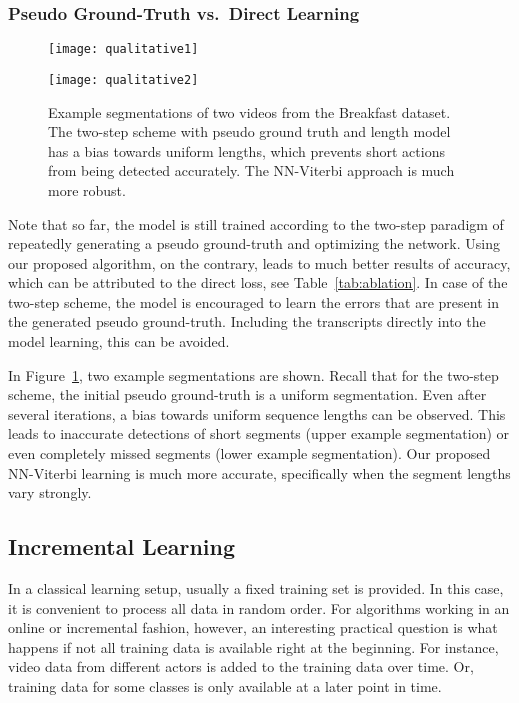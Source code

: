 \documentclass[10pt,twocolumn,letterpaper]{article}
\begin{document}
\subsubsection{Pseudo Ground-Truth vs.\ Direct Learning}
\begin{figure}[tb]
    \centering
    \texttt{[image: qualitative1]}

    \vspace{0.3cm}
    \texttt{[image: qualitative2]}
    \caption{Example segmentations of two videos from the Breakfast dataset. The two-step scheme
             with pseudo ground truth and length model has a bias towards uniform lengths, which prevents short
             actions from being detected accurately. The NN-Viterbi approach is much more robust.}
    \label{fig:qualitative}
    \vspace{-0.3cm}
\end{figure}
Note that so far, the model is still trained according to the two-step paradigm of repeatedly
generating a pseudo ground-truth and optimizing the network. Using our proposed algorithm,
on the contrary, leads to much better results of  accuracy, which can be attributed
to the direct loss, see Table~\ref{tab:ablation}. In case of the two-step scheme, the model is encouraged to learn
the errors that are present in the generated pseudo ground-truth. Including the transcripts
directly into the model learning, this can be avoided.

In Figure~\ref{fig:qualitative}, two example segmentations are shown. Recall that for the two-step
scheme, the initial pseudo ground-truth is a uniform segmentation. Even after several iterations,
a bias towards uniform sequence lengths can be observed. This leads to inaccurate detections of
short segments (upper example segmentation) or even completely missed segments (lower example segmentation).
Our proposed NN-Viterbi learning is much more accurate, specifically when the segment lengths
vary strongly.

\subsection{Incremental Learning}
\label{sec:incremental}

In a classical learning setup, usually a fixed training set is provided. In this case,
it is convenient to process all data in random order.
For algorithms working in an online or incremental fashion,
however, an interesting practical question is what happens if not all training data is
available right at the beginning. For instance, video data from different actors is
added to the training data over time. Or, training data for some classes is only available
at a later point in time.
\end{document}
